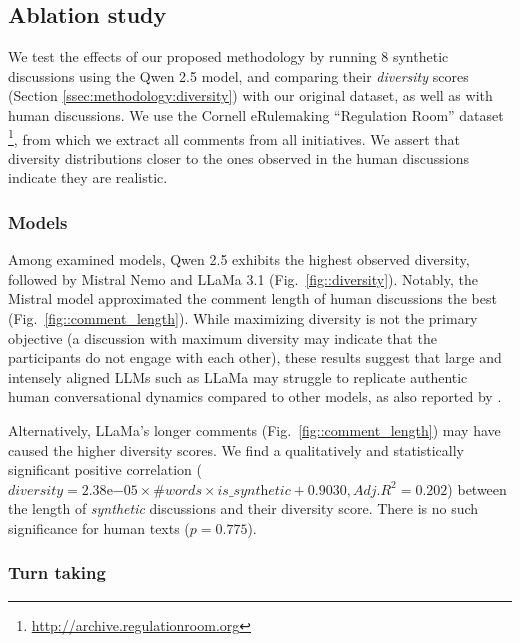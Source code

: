 \subsection{Ablation study}
\label{ssec:results:ablation}

We test the effects of our proposed methodology by running $8$ synthetic discussions using the Qwen 2.5 model, and comparing their \textit{diversity} scores (Section \ref{ssec:methodology:diversity}) with our original dataset, as well as with human discussions. We use the Cornell eRulemaking “Regulation Room” dataset \footnote{\url{http://archive.regulationroom.org}}, from which we extract all comments from all initiatives. We assert that diversity distributions closer to the ones observed in the human discussions indicate they are realistic.



\subsubsection{Models}

Among examined models, Qwen 2.5 exhibits the highest observed diversity, followed by Mistral Nemo and LLaMa 3.1 (Fig.~\ref{fig::diversity}). Notably, the Mistral model approximated the comment length of human discussions the best (Fig.~\ref{fig::comment_length}). While maximizing diversity is not the primary objective (a discussion with maximum diversity may indicate that the participants do not engage with each other), these results suggest that large and intensely aligned \acp{LLM} such as LLaMa may struggle to replicate authentic human conversational dynamics compared to other models, as also reported by \citep{Park2023GenerativeAI}.

Alternatively, LLaMa's longer comments (Fig.~\ref{fig::comment_length}) may have caused the higher diversity scores. We find a qualitatively and statistically significant positive correlation ($\textit{diversity} = 2.38\mathrm{e}{-05} \times \textit{\#words} \times \textit{is\_synthetic} + 0.9030, Adj. R^2=0.202$) between the length of \textit{synthetic} discussions and their diversity score. There is no such significance for human texts ($p=0.775$).


\subsubsection{Turn taking}

